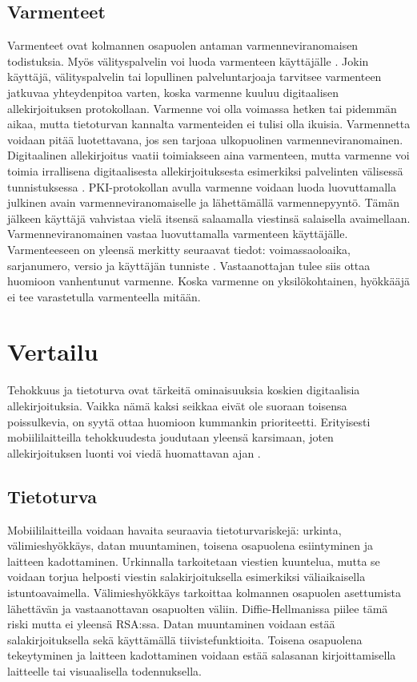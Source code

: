 \documentclass[finnish]{tktltiki2}
\theoremstyle{definition}
\theoremstyle{remark}
\begin{document}
\subsection{Varmenteet}

Varmenteet ovat kolmannen osapuolen antaman varmenneviranomaisen todistuksia. Myös välityspalvelin voi luoda varmenteen käyttäjälle \cite{proxy}. Jokin käyttäjä, välityspalvelin tai lopullinen palveluntarjoaja tarvitsee varmenteen jatkuvaa yhteydenpitoa varten, koska varmenne kuuluu digitaalisen allekirjoituksen protokollaan. Varmenne voi olla voimassa hetken tai pidemmän aikaa, mutta tietoturvan kannalta varmenteiden ei tulisi olla ikuisia. Varmennetta voidaan pitää luotettavana, jos sen tarjoaa ulkopuolinen varmenneviranomainen. Digitaalinen allekirjoitus vaatii toimiakseen aina varmenteen, mutta varmenne voi toimia irrallisena digitaalisesta allekirjoituksesta esimerkiksi palvelinten välisessä tunnistuksessa \cite{proxy}. PKI-protokollan avulla varmenne voidaan luoda luovuttamalla julkinen avain varmenneviranomaiselle ja lähettämällä varmennepyyntö. Tämän jälkeen käyttäjä vahvistaa vielä itsensä salaamalla viestinsä salaisella avaimellaan. Varmenneviranomainen vastaa luovuttamalla varmenteen käyttäjälle. Varmenteeseen on yleensä merkitty seuraavat tiedot: voimassaoloaika, sarjanumero, versio ja käyttäjän tunniste \cite{ECC}. Vastaanottajan tulee siis ottaa huomioon vanhentunut varmenne. Koska varmenne on yksilökohtainen, hyökkääjä ei tee varastetulla varmenteella mitään. 

\section{Vertailu}

Tehokkuus ja tietoturva ovat tärkeitä ominaisuuksia koskien digitaalisia allekirjoituksia. Vaikka nämä kaksi seikkaa eivät ole suoraan toisensa poissulkevia, on syytä ottaa huomioon kummankin prioriteetti. Erityisesti mobiililaitteilla tehokkuudesta joudutaan yleensä karsimaan, joten allekirjoituksen luonti voi viedä huomattavan ajan \cite{proxy}. 

\subsection{Tietoturva}

Mobiililaitteilla voidaan havaita seuraavia tietoturvariskejä: urkinta, välimieshyökkäys, datan muuntaminen, toisena osapuolena esiintyminen ja laitteen kadottaminen. Urkinnalla tarkoitetaan viestien kuuntelua, mutta se voidaan torjua helposti viestin salakirjoituksella esimerkiksi väliaikaisella istuntoavaimella. Välimieshyökkäys tarkoittaa kolmannen osapuolen asettumista lähettävän ja vastaanottavan osapuolten väliin. Diffie-Hellmanissa piilee tämä riski mutta ei yleensä RSA:ssa. Datan muuntaminen voidaan estää salakirjoituksella sekä käyttämällä tiivistefunktioita. Toisena osapuolena tekeytyminen ja laitteen kadottaminen voidaan estää salasanan kirjoittamisella laitteelle tai visuaalisella todennuksella. 
\end{document}
